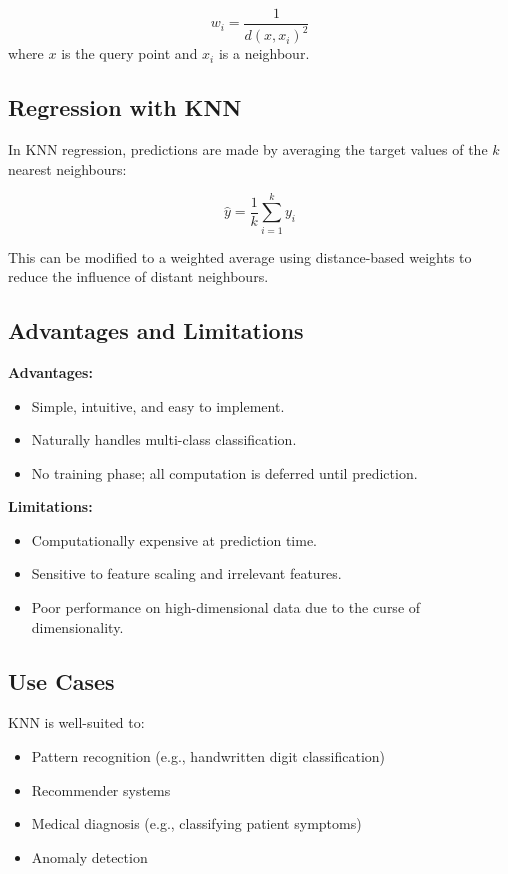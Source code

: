 \documentclass[9pt]{extarticle}
\begin{document}
\[
w_i = \frac{1}{d(x, x_i)^2}
\]
where $x$ is the query point and $x_i$ is a neighbour.

\subsection{Regression with KNN}

In KNN regression, predictions are made by averaging the target values of the $k$ nearest neighbours:

\[
\hat{y} = \frac{1}{k} \sum_{i=1}^{k} y_i
\]

This can be modified to a weighted average using distance-based weights to reduce the influence of distant neighbours.

\subsection{Advantages and Limitations}

\textbf{Advantages:}
\begin{itemize}
    \item Simple, intuitive, and easy to implement.
    \item Naturally handles multi-class classification.
    \item No training phase; all computation is deferred until prediction.
\end{itemize}

\textbf{Limitations:}
\begin{itemize}
    \item Computationally expensive at prediction time.
    \item Sensitive to feature scaling and irrelevant features.
    \item Poor performance on high-dimensional data due to the curse of dimensionality.
\end{itemize}

\subsection{Use Cases}

KNN is well-suited to:

\begin{itemize}
    \item Pattern recognition (e.g., handwritten digit classification)
    \item Recommender systems
    \item Medical diagnosis (e.g., classifying patient symptoms)
    \item Anomaly detection
\end{itemize}
\end{document}
